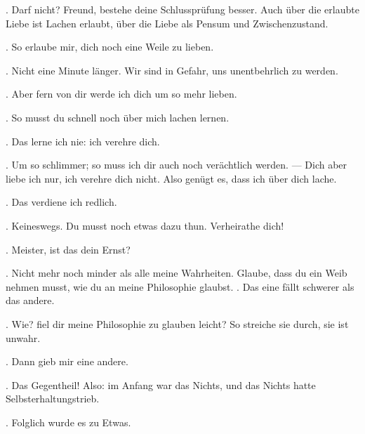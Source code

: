 . Darf nicht? Freund, bestehe deine Schlussprüfung besser. Auch über die erlaubte Liebe ist Lachen erlaubt, über die Liebe als Pensum und Zwischenzustand.
\par

. So erlaube mir, dich noch eine Weile zu lieben.
\par

. Nicht eine Minute länger. Wir sind in Gefahr, uns unentbehrlich zu werden.
\par

. Aber fern von dir werde ich dich um so mehr lieben.
\par

. So musst du schnell noch über mich lachen lernen.
\par

. Das lerne ich nie: ich verehre dich.
\par

. Um so schlimmer; so muss ich dir auch noch verächtlich werden. — Dich aber liebe ich nur, ich verehre dich nicht. Also genügt es, dass ich über dich lache.
\par

. Das verdiene ich redlich.
\par

. Keineswegs. Du musst noch etwas dazu thun. Verheirathe dich!
\par

. Meister, ist das dein Ernst?
\par

. Nicht mehr noch minder als alle meine Wahrheiten. Glaube, dass du ein Weib nehmen musst, wie du an meine Philosophie glaubst. . Das eine fällt schwerer als das andere.
\par

. Wie? fiel dir meine Philosophie zu glauben leicht? So streiche sie durch, sie ist unwahr.
\par

. Dann gieb mir eine andere.
\par

. Das Gegentheil! Also: im Anfang war das Nichts, und das Nichts hatte Selbsterhaltungstrieb.
\par

. Folglich wurde es zu Etwas.
\par

